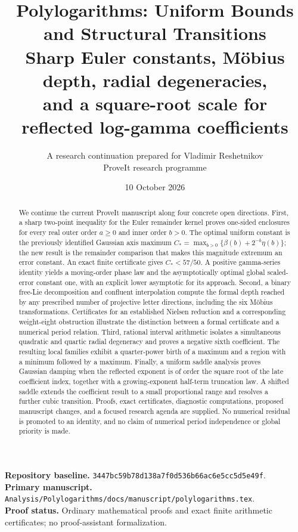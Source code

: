 \documentclass[11pt]{article}
\title{Polylogarithms: Uniform Bounds and Structural Transitions\\[6pt]
\large Sharp Euler constants, M\"obius depth, radial degeneracies,\\
and a square-root scale for reflected log-gamma coefficients}
\author{A research continuation prepared for Vladimir Reshetnikov\\
\small ProveIt research programme}
\date{10 October 2026}
\numberwithin{equation}{section}
\theoremstyle{plain}
\theoremstyle{definition}
\theoremstyle{remark}
\newcommand{\src}[1]{\nolinkurl{#1}}
\begin{document}
\maketitle
\begin{abstract}
We continue the current ProveIt manuscript along four concrete open
directions. First, a sharp two-point inequality for the Euler remainder
kernel proves one-sided enclosures for every real outer order $a\geq0$
and inner order $b>0$. The optimal uniform constant is the previously
identified Gaussian axis maximum
$C_*=\max_{b>0}\{\beta(b)+2^{-b}\eta(b)\}$; the new result is the
remainder comparison that makes this magnitude extremum an error
constant. An exact finite certificate gives $C_*<57/50$. A positive gamma-series
identity yields a moving-order phase law and the asymptotically optimal
global scaled-error constant one, with an explicit lower asymptotic
for its approach.
Second, a binary free-Lie decomposition and confluent interpolation
compute the formal depth reached by any prescribed number of projective
letter directions, including the six M\"obius transformations. Certificates for an established
Nielsen reduction and a corresponding weight-eight obstruction illustrate
the distinction between a formal certificate and a numerical period relation.
Third, rational interval arithmetic isolates a simultaneous quadratic
and quartic radial degeneracy and proves a negative sixth coefficient.
The resulting local families exhibit a quarter-power birth of a maximum
and a region with a minimum followed by a maximum. Finally, a uniform
saddle analysis proves Gaussian damping when the reflected exponent
is of order the square root of the late coefficient index, together
with a growing-exponent half-term truncation law. A shifted saddle
extends the coefficient result to a small proportional range and
resolves a further cubic transition. Proofs, exact
certificates, diagnostic computations, proposed manuscript changes,
and a focused research agenda are supplied. No numerical residual
is promoted to an identity, and no claim of numerical period
independence or global priority is made.
\end{abstract}
\vspace{1em}
\noindent\textbf{Repository baseline.}
\src{3447bc59b78d138a7f0d536b66ac6e5cc5d5e49f}.\\
\textbf{Primary manuscript.}
\src{Analysis/Polylogarithms/docs/manuscript/polylogarithms.tex}.\\
\textbf{Proof status.} Ordinary mathematical proofs and exact finite
arithmetic certificates; no proof-assistant formalization.
\clearpage
{\small\tableofcontents}
\clearpage








{\small}
\end{document}
